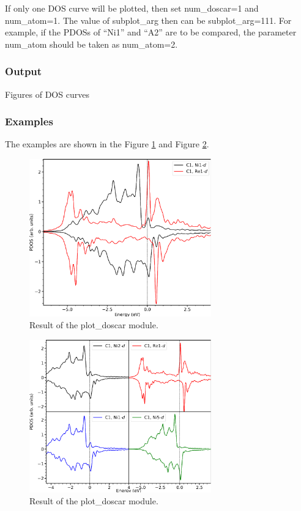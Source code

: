 \documentclass[12pt]{book}
\begin{document}
If only one DOS curve will be plotted, then set num\_doscar=1 and num\_atom=1. The value of subplot\_arg then can be  subplot\_arg=111. For example, if the PDOSs of ``Ni1'' and ``A2''  are to be compared, the parameter num\_atom should be taken as num\_atom=2.

\subsubsection{Output}
Figures of DOS curves

\subsubsection{Examples}

The examples are shown in the Figure \ref{fig:outputs_plot_doscar1} and Figure \ref{fig:outputs_plot_doscar2}.

\begin{figure}[htbp]
\centering
\includegraphics[width=0.7\textwidth]{outputs_plot_doscar1.pdf}
\caption{Result of the plot\_doscar module.}
\label{fig:outputs_plot_doscar1}
\end{figure}

\begin{figure}[htbp]
\centering
\includegraphics[width=0.7\textwidth]{outputs_plot_doscar2.pdf}
\caption{Result of the plot\_doscar module.}
\label{fig:outputs_plot_doscar2}
\end{figure}
\end{document}
